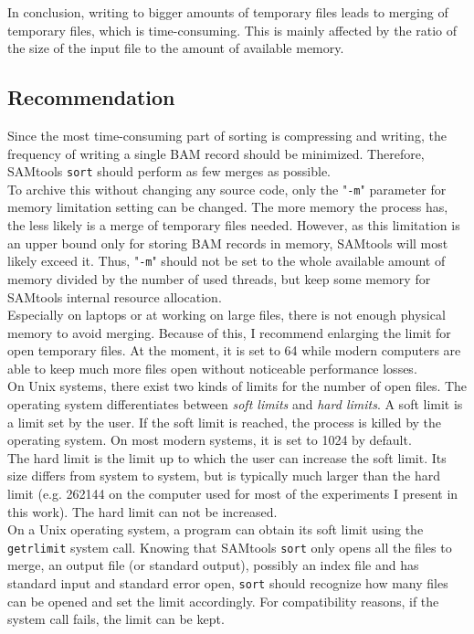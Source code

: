 In conclusion, writing to bigger amounts of temporary files leads to merging of temporary files, which is time-consuming. This is mainly affected by the ratio of the size of the input file to the amount of available memory.

\subsection{Recommendation}

Since the most time-consuming part of sorting is compressing and writing, the frequency of writing a single BAM record should be minimized. Therefore, SAMtools \texttt{sort} should perform as few merges as possible. \\
To archive this without changing any source code, only the "\texttt{-m}" parameter for memory limitation setting can be changed. The more memory the process has, the less likely is a merge of temporary files needed. However, as this limitation is an upper bound only for storing BAM records in memory, SAMtools will most likely exceed it. Thus, "\texttt{-m}" should not be set to the whole available amount of memory divided by the number of used threads, but keep some memory for SAMtools internal resource allocation. \\
Especially on laptops or at working on large files, there is not enough physical memory to avoid merging. Because of this, I recommend enlarging the limit for open temporary files. At the moment, it is set to 64 while modern computers are able to keep much more files open without noticeable performance losses. \\
On Unix systems, there exist two kinds of limits for the number of open files. The operating system differentiates between \textit{soft limits} and \textit{hard limits}.
A soft limit is a limit set by the user. If the soft limit is reached, the process is killed by the operating system. On most modern systems, it is set to 1024 by default. \\
The hard limit is the limit up to which the user can increase the soft limit. Its size differs from system to system, but is typically much larger than the hard limit (e.g. 262144 on the computer used for most of the experiments I present in this work). The hard limit can not be increased. \\
On a Unix operating system, a program can obtain its soft limit using the \texttt{getrlimit} \cite{noauthor_getrlimit2_nodate} system call. Knowing that SAMtools \texttt{sort} only opens all the files to merge, an output file (or standard output), possibly an index file and has standard input and standard error open, \texttt{sort} should recognize how many files can be opened and set the limit accordingly. For compatibility reasons, if the system call fails, the limit can be kept.
